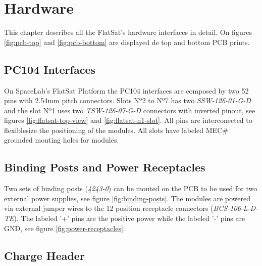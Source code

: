 %
%
%
%
%

%
%
%
%
%
%

\chapter{Hardware} \label{ch:hardware}

This chapter describes all the FlatSat's hardware interfaces in detail. On figures \ref{fig:pcb-top} and \ref{fig:pcb-bottom} are displayed de top and bottom PCB prints.

\section{PC104 Interfaces}

On SpaceLab's FlatSat Platform the PC104 interfaces are composed by two 52 pins with 2.54mm pitch connectors. Slots Nº2 to Nº7 has two \textit{SSW-126-01-G-D} and the slot Nº1 uses two \textit{TSW-126-07-G-D} connectors with inverted pinout, see figures \ref{fig:flatsat-top-view} and \ref{fig:flatsat-n1-slot}. All pins are interconected to flexiblesize the positioning of the modules. All slots have labeled MEC\# grounded mouting holes for modules.

\section{Binding Posts and Power Receptacles}

Two sets of binding posts (\textit{4243-0}) can be mouted on the PCB to be used for two external power supplies, see figure \ref{fig:binding-posts}. The modules are powered via external jumper wires to the 12 position receptacle connectors (\textit{BCS-106-L-D-TE}). The labeled '+' pins are the positive power while the labeled '-' pins are GND, see figure \ref{fig:power-receptacles}.

\section{Charge Header}

